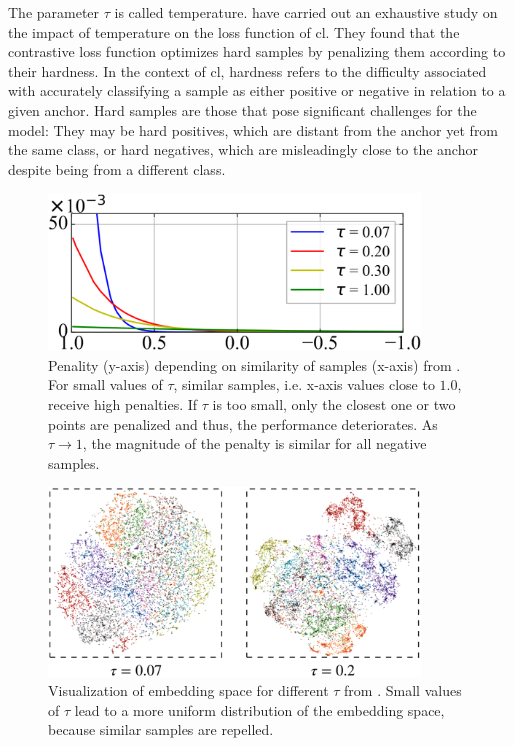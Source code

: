 The parameter $\tau$ is called temperature.
\citet{CL_temp_2021} have carried out an exhaustive study on the impact of temperature on the loss function of \ac{cl}.
They found that the contrastive loss function optimizes hard samples by penalizing them according to their hardness.
In the context of \ac{cl}, hardness refers to the difficulty associated with accurately classifying 
a sample as either positive or negative in relation to a given anchor.
Hard samples are those that pose significant challenges for the model: 
They may be hard positives, which are distant from the anchor yet from the same class, 
or hard negatives, which are misleadingly close to the anchor despite being from a different class.

\begin{figure}[!htb] %
    \centering
    \includegraphics[width=280pt]{images/gradient_ratio_dep_on_temperature.png}
    \caption{Penality (y-axis) depending on similarity of samples (x-axis) from \citet{CL_temp_2021}. 
    For small values of $\tau$, similar samples, i.e. x-axis values close to $1.0$, receive high penalties.
    If $\tau$ is too small, only the closest one or two points are penalized and thus, the performance deteriorates.
    As $\tau \rightarrow 1$, the magnitude of the penalty is similar for all negative samples.
    }
    \label{fig:gradient_ratio_dep_on_temperature}
\end{figure}

\begin{figure}[!htb] %
    \centering
    \includegraphics[width=280pt]{images/tsne_dep_on_temperature.png}
    \caption{Visualization of embedding space for different $\tau$ from \citet{CL_temp_2021}.
    Small values of $\tau$ lead to a more uniform distribution of the embedding space, 
    because similar samples are repelled.
    }
    \label{fig:tsne_dep_on_temperature}
\end{figure}


